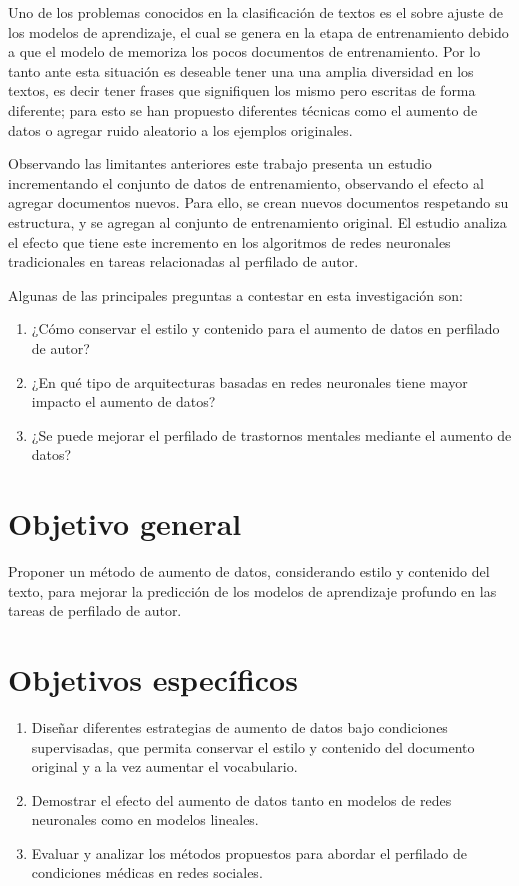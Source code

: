 Uno de los problemas conocidos en la clasificación de textos es el sobre ajuste de los modelos de aprendizaje, el cual se genera en la etapa de entrenamiento debido a que el modelo de  memoriza los pocos documentos de entrenamiento. Por lo tanto ante esta situación es deseable tener una una amplia diversidad en los textos, es decir tener frases que signifiquen los mismo pero escritas de forma diferente; para esto se han propuesto diferentes técnicas como el aumento de datos o agregar ruido aleatorio a los ejemplos originales.

Observando las limitantes anteriores este trabajo presenta un estudio incrementando el conjunto de datos de entrenamiento, observando el efecto al agregar documentos nuevos. Para ello, se crean nuevos documentos respetando su estructura, y se agregan al  conjunto de entrenamiento original. El estudio analiza el efecto que tiene este incremento en los algoritmos de redes neuronales tradicionales en tareas relacionadas al perfilado de autor. 

Algunas de las principales preguntas a contestar en esta investigación son:

\begin{enumerate}
    \item {¿Cómo conservar el estilo y contenido para el aumento de datos en perfilado de autor?}
    \item ¿En qué tipo de arquitecturas basadas en redes neuronales tiene mayor impacto el aumento de datos?
    \item ¿Se puede mejorar el perfilado de trastornos mentales mediante el aumento de datos?
\end{enumerate}


\section{Objetivo general}

Proponer un método de aumento de datos, considerando estilo y contenido del texto, para mejorar la predicción de los modelos de aprendizaje profundo en las tareas de perfilado de autor.


\section{Objetivos específicos}
\begin{enumerate}
    \item Diseñar diferentes estrategias de aumento de datos bajo condiciones supervisadas, que permita conservar el estilo y contenido del documento original y a la vez aumentar el vocabulario.
    \item Demostrar el efecto del aumento de datos tanto en modelos de redes neuronales como en modelos lineales.
    \item Evaluar y analizar los métodos propuestos para abordar el perfilado de condiciones médicas en redes sociales.
 
\end{enumerate}

